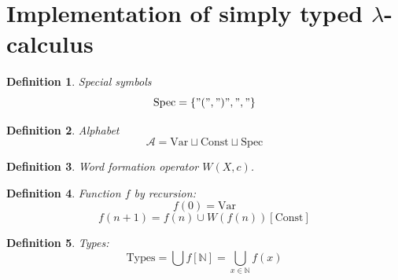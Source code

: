 \documentclass[10pt,a4paper]{article}
\newtheorem{definition}{Definition}
\newcommand{\Var}{\mbox{Var}}
\newcommand{\Const}{\mbox{Const}}
\newcommand{\Spec}{\mbox{Spec}}
\newcommand{\Types}{\mbox{Types}}
\newcommand{\Nat}{\mathbb{N}}
\newcommand{\Union}{\bigcup}
\begin{document}
\section{Implementation of simply typed $\lambda$-calculus}
\begin{definition} Special symbols 
\[ \Spec = \{"(",")",","\} \]
\end{definition}

\begin{definition}
Alphabet \[ \mathcal{A} = \Var\sqcup\Const\sqcup\Spec \]
\end{definition}

\begin{definition}
Word formation operator $W(X,c)$.
\end{definition}

\begin{definition}
Function $f$ by recursion:
\[f(0) = \Var\]
\[f(n+1) = f(n)\cup W(f(n))[\Const]\]
\end{definition}

\begin{definition}
Types:
\[\Types = \Union f[\Nat] = \Union_{x\in\Nat}f(x) \]
\end{definition}



\end{document}
